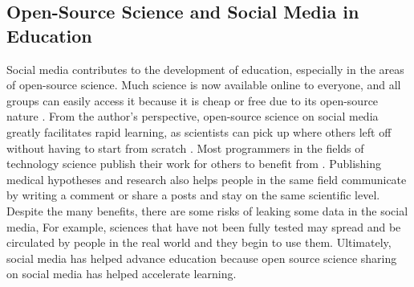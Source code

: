 \documentclass{article}
\begin{document}
\subsection{Open-Source Science and Social Media in Education}
Social media contributes to the development of education, especially in the areas of open-source science. Much science is now available online to everyone, and all groups can easily access it because it is cheap or free due to its open-source nature \citep{siddiqi2024}. From the author's perspective, open-source science on social media greatly facilitates rapid learning, as scientists can pick up where others left off without having to start from scratch \citep{hilton2016}. Most programmers in the fields of technology science publish their work for others to benefit from \citep{hilton2016}. Publishing medical hypotheses and research also helps people in the same field communicate by writing a comment or share a posts and stay on the same scientific level. Despite the many benefits, there are some risks of leaking some data in the social media, For example, sciences that have not been fully tested may spread and be circulated by people in the real world and they begin to use them. Ultimately, social media has helped advance education because open source science sharing on social media has helped accelerate learning.
\end{document}
